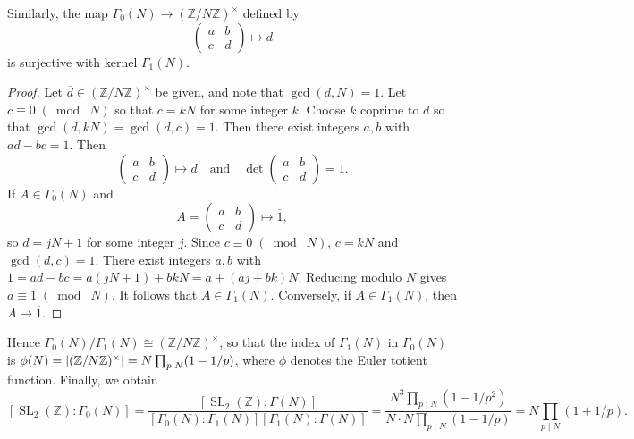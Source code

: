 \documentclass[10pt,leqno]{article}
\theoremstyle{plain}
\theoremstyle{definition}
\numberwithin{equation}{section}
\numberwithin{lem}{section}
\DeclareMathOperator{\SL}{SL}
\newcommand{\smod}[1]{\;(\bmod\; #1)}
\begin{document}
Similarly, the map $\varGamma_0(N)\to (\mathbb{Z}/N\mathbb{Z})^\times$ defined by \[\begin{pmatrix}
    a & b \\ c & d
\end{pmatrix}\mapsto \overline d\] 
is surjective with kernel $\varGamma_1(N)$.
\begin{proof}
    Let $\overline d \in (\mathbb{Z}/N\mathbb{Z})^\times$ be given, and note that $\gcd(d,N)=1$. Let $c \equiv 0\smod N$ so that $c=kN$ for some integer $k$. Choose $k$ coprime to $d$ so that $\gcd(d,kN) = \gcd(d,c) = 1$. Then there exist integers $a,b$ with $ad-bc = 1$. Then \[\begin{pmatrix}
        a & b \\ c & d
    \end{pmatrix}\mapsto d\quad\text{and}\quad \det\begin{pmatrix}
        a & b \\ c & d
    \end{pmatrix} = 1.\] 
    If $A\in \varGamma_0(N)$ and \[A = \begin{pmatrix}
        a & b \\ c & d
    \end{pmatrix}\mapsto \overline 1,\] so $d = jN+1$ for some integer $j$. Since $c\equiv 0\smod N$, $c= kN$ and $\gcd(d,c) = 1$. There exist integers $a,b$ with $1 = ad-bc = a(jN+1) + bkN = a+ (aj + bk)N$. Reducing modulo $N$ gives $a\equiv 1\smod N$. It follows that $A\in \varGamma_1(N)$. Conversely, if $A\in \varGamma_1(N)$, then $A\mapsto \overline 1$.
\end{proof}
Hence $\varGamma_0(N)/\varGamma_1(N)\cong (\mathbb{Z}/N\mathbb{Z})^\times$, so that the index of $\varGamma_1(N)$ in $\varGamma_0(N)$ is $\phi(N) = \abs{(\mathbb{Z}/N\mathbb{Z})^\times} = N\prod_{p\mid N}(1-1/p)$, where $\phi$ denotes the Euler totient function. Finally, we obtain \[[\SL_2(\mathbb{Z}) : \varGamma_0(N)] = \frac{[\SL_2(\mathbb{Z}) : \varGamma(N)]}{[\varGamma_0(N) : \varGamma_1(N)][\varGamma_1(N) : \varGamma(N)]} = \frac{N^3\prod_{p\mid N}(1-1/p^2)}{N\cdot N\prod_{p\mid N}(1-1/p)} = N\prod_{p\mid N}(1+1/p).\]
\end{document}
